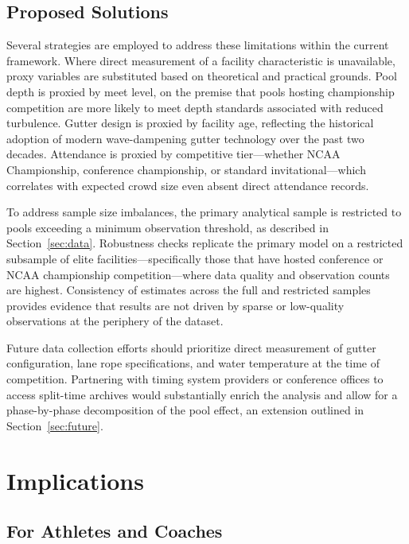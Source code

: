 \documentclass[12pt]{article}
\begin{document}
\subsection{Proposed Solutions}

Several strategies are employed to address these limitations within the current
framework. Where direct measurement of a facility characteristic is unavailable,
proxy variables are substituted based on theoretical and practical grounds. Pool
depth is proxied by meet level, on the premise that pools hosting championship
competition are more likely to meet depth standards associated with reduced
turbulence. Gutter design is proxied by facility age, reflecting the historical
adoption of modern wave-dampening gutter technology over the past two decades.
Attendance is proxied by competitive tier---whether NCAA Championship, conference
championship, or standard invitational---which correlates with expected crowd
size even absent direct attendance records.

To address sample size imbalances, the primary analytical sample is restricted
to pools exceeding a minimum observation threshold, as described in
Section~\ref{sec:data}. Robustness checks replicate the primary model on a
restricted subsample of elite facilities---specifically those that have hosted
conference or NCAA championship competition---where data quality and observation
counts are highest. Consistency of estimates across the full and restricted
samples provides evidence that results are not driven by sparse or low-quality
observations at the periphery of the dataset.

Future data collection efforts should prioritize direct measurement of gutter
configuration, lane rope specifications, and water temperature at the time of
competition. Partnering with timing system providers or conference offices to
access split-time archives would substantially enrich the analysis and allow for
a phase-by-phase decomposition of the pool effect, an extension outlined in
Section~\ref{sec:future}.

\section{Implications}

\subsection{For Athletes and Coaches}
\end{document}
